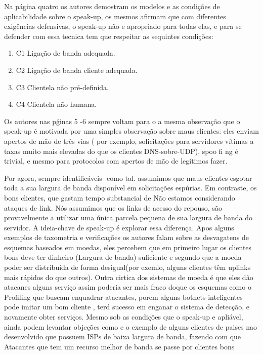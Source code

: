 \documentclass[a4paper,12pt]{article}
\begin{document}
Na página quatro os autores demostram os modelos e as condições de aplicabilidade sobre o  speak-up, os mesmos afirmam que com diferentes exigências defensivas, o speak-up não e apropriado para todas elas, e para se defender com essa tecnica tem que respeitar as sequintes condições: 
\vspace{1cm}
\begin{enumerate}
	\item{C1} Ligação de banda adequada.

	\item{C2} Ligação de banda cliente adequada.

	\item{C3} Clientela não pré-definida.

	\item{C4} Clientela não humana.

\end{enumerate}
 
 Os autores nas pǵinas 5 -6 sempre voltam para o a mesma observação que o speak-up é motivada por uma simples observação sobre maus clientes: eles enviam
 apertos de mão de três vias ( por exemplo,
 solicitações para servidores vítimas a taxas muito mais elevadas do que os clientes
 DNS-sobre-UDP), spoo fi ng é trivial, e mesmo para protocolos com apertos de mão de
 legítimos fazer.
 
 \vspace{0.5cm}
 
 Por agora,
 sempre identificáveis ​ como tal.
 assumimos que maus clientes esgotar toda a sua largura de banda disponível em
 solicitações espúrias. Em contraste, os bons clientes, que gastam tempo substancial de
 Não estamos considerando ataques de link. Nós assumimos que os links de acesso do
 repouso, são provavelmente a utilizar uma única parcela pequena de sua largura de banda
 do servidor. A ideia-chave de speak-up é explorar essa diferença.
 \vspace{0.5cm}
 Apos alguns exemplos de taxometria e verificações os autores falam sobre as desvagatens de esquemas baseados em moedas, eles percebem que em primeiro lugar os clientes bons deve ter dinheiro (Largura de banda) suficiente e segundo que a moeda poder ser distribuida de forma desigual(por exemlo, alguns clientes têm uplinks mais rápidos do que outros). Outra cirtica dos sistemas de moeda é que eles dão atacanes alguns serviço assim poderia ser mais fraco doque os esquemas como o Profiling que buscam enquadrar atacantes, porem alguns botnets inteligentes pode imitar um bom cliente , terd sucesso em enganar o sistema de detecção, e novamente obter serviços.
 \vspace{0.5cm}
 Mesmo sob as condições que o speak-up e apliável, ainda podem levantar objeções como e o exemplo de alguns clientes de paises nao desenvolvido que possuem ISPs de baixa largura de banda, fazendo com que Atacantes que tem um recurso melhor de banda se passe por clientes bons 
 
\vspace{3cm}

\begin{center}
\end{center}

 
\end{document}
